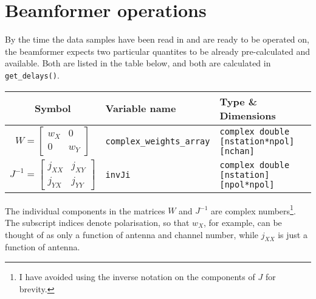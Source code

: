 \documentclass{article}
\begin{document}
\section{Beamformer operations}

By the time the data samples have been read in and are ready to be operated on, the beamformer expects two particular quantites to be already pre-calculated and available.
Both are listed in the table below, and both are calculated in \texttt{get\_delays()}.
\begin{table}[!h]
    \centering
    \begin{tabular}{c|l|l}
        Symbol & Variable name & Type \& Dimensions \\[5pt]
        \hline
        $W = \begin{bmatrix} w_X & 0 \\ 0 & w_Y \end{bmatrix}$ & \texttt{complex\_weights\_array} & \texttt{complex double [nstation*npol][nchan]} \\[12pt]
        $J^{-1} = \begin{bmatrix} j_{XX} & j_{XY} \\ j_{YX} & j_{YY} \end{bmatrix}$ & \texttt{invJi} & \texttt{complex double [nstation][npol*npol]}
    \end{tabular}
\end{table}
The individual components in the matrices $W$ and $J^{-1}$ are complex numbers\footnote{I have avoided using the inverse notation on the components of $J$ for brevity.}. The subscript indices denote polarisation, so that $w_X$, for example, can be thought of as only a function of antenna and channel number, while $j_{XX}$ is just a function of antenna.
\end{document}
